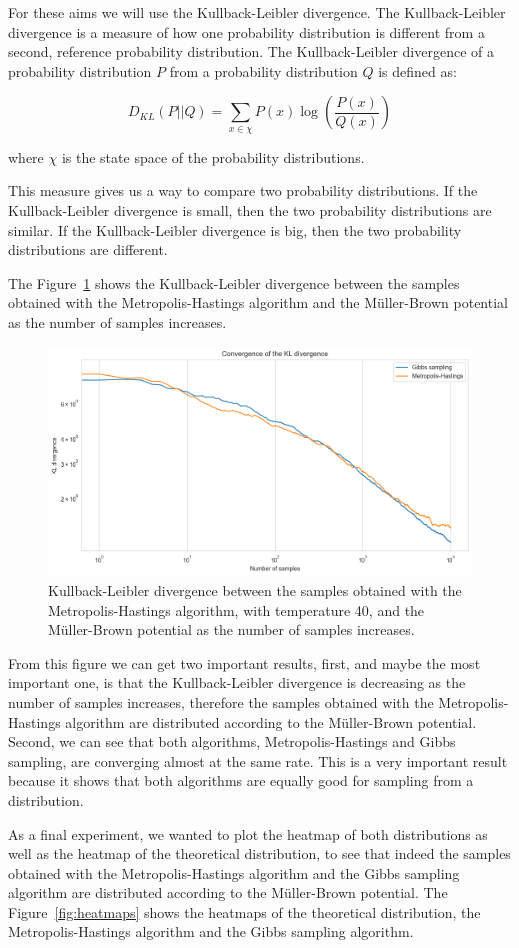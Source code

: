 \documentclass{report}
\begin{document}
For these aims we will use the Kullback-Leibler divergence. The Kullback-Leibler divergence is a measure of how one probability distribution is different from a second, reference probability distribution. The Kullback-Leibler divergence of a probability distribution $P$ from a probability distribution $Q$ is defined as:

\[
	D_{KL}(P||Q) = \sum_{x \in \chi} P(x) \log \left( \frac{P(x)}{Q(x)} \right)
\]

where $\chi$ is the state space of the probability distributions.

This measure gives us a way to compare two probability distributions. If the Kullback-Leibler divergence is small, then the two probability distributions are similar. If the Kullback-Leibler divergence is big, then the two probability distributions are different. 

The Figure~\ref{fig:klmh} shows the Kullback-Leibler divergence between the samples obtained with the Metropolis-Hastings algorithm and the Müller-Brown potential as the number of samples increases.

\begin{figure}[H]
	\centering
	\includegraphics[width=0.5\linewidth]{./Figures/MCMC/klmh.png}
	\caption{Kullback-Leibler divergence between the samples obtained with the Metropolis-Hastings algorithm, with temperature 40, and the Müller-Brown potential as the number of samples increases.}
	\label{fig:klmh}
\end{figure}

From this figure we can get two important results, first, and maybe the most important one, is that the Kullback-Leibler divergence is decreasing as the number of samples increases, therefore the samples obtained with the Metropolis-Hastings algorithm are distributed according to the Müller-Brown potential. Second, we can see that both algorithms, Metropolis-Hastings and Gibbs sampling, are converging almost at the same rate. This is a very important result because it shows that both algorithms are equally good for sampling from a distribution.

As a final experiment, we wanted to plot the heatmap of both distributions as well as the heatmap of the theoretical distribution, to see that indeed the samples obtained with the Metropolis-Hastings algorithm and the Gibbs sampling algorithm are distributed according to the Müller-Brown potential. The Figure~\ref{fig:heatmaps} shows the heatmaps of the theoretical distribution, the Metropolis-Hastings algorithm and the Gibbs sampling algorithm.
\end{document}
